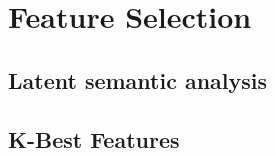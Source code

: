 \section{Feature Selection}

\subsection{Latent semantic analysis}



\subsection{K-Best Features}


